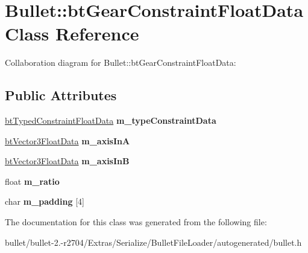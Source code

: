 \hypertarget{class_bullet_1_1bt_gear_constraint_float_data}{\section{Bullet\+:\+:bt\+Gear\+Constraint\+Float\+Data Class Reference}
\label{class_bullet_1_1bt_gear_constraint_float_data}
}


Collaboration diagram for Bullet\+:\+:bt\+Gear\+Constraint\+Float\+Data\+:
\subsection*{Public Attributes}
\begin{DoxyCompactItemize}
\item 
\hypertarget{class_bullet_1_1bt_gear_constraint_float_data_a323c708990de318fd67b847f8a03a0a0}{\hyperlink{class_bullet_1_1bt_typed_constraint_float_data}{bt\+Typed\+Constraint\+Float\+Data} {\bfseries m\+\_\+type\+Constraint\+Data}}\label{class_bullet_1_1bt_gear_constraint_float_data_a323c708990de318fd67b847f8a03a0a0}

\item 
\hypertarget{class_bullet_1_1bt_gear_constraint_float_data_a277e3f6c3859ef310a73b45ade3f6ab5}{\hyperlink{class_bullet_1_1bt_vector3_float_data}{bt\+Vector3\+Float\+Data} {\bfseries m\+\_\+axis\+In\+A}}\label{class_bullet_1_1bt_gear_constraint_float_data_a277e3f6c3859ef310a73b45ade3f6ab5}

\item 
\hypertarget{class_bullet_1_1bt_gear_constraint_float_data_a1ca6b34bf93eae7b27333a0022b8c9c3}{\hyperlink{class_bullet_1_1bt_vector3_float_data}{bt\+Vector3\+Float\+Data} {\bfseries m\+\_\+axis\+In\+B}}\label{class_bullet_1_1bt_gear_constraint_float_data_a1ca6b34bf93eae7b27333a0022b8c9c3}

\item 
\hypertarget{class_bullet_1_1bt_gear_constraint_float_data_a2bd0b052826df50cbe5cff16b21ece5b}{float {\bfseries m\+\_\+ratio}}\label{class_bullet_1_1bt_gear_constraint_float_data_a2bd0b052826df50cbe5cff16b21ece5b}

\item 
\hypertarget{class_bullet_1_1bt_gear_constraint_float_data_a63bc8b2402458fc05625d4f58b348b4e}{char {\bfseries m\+\_\+padding} \mbox{[}4\mbox{]}}\label{class_bullet_1_1bt_gear_constraint_float_data_a63bc8b2402458fc05625d4f58b348b4e}

\end{DoxyCompactItemize}


The documentation for this class was generated from the following file\+:\begin{DoxyCompactItemize}
\item 
bullet/bullet-\/2.-\/r2704/\+Extras/\+Serialize/\+Bullet\+File\+Loader/autogenerated/bullet.\+h\end{DoxyCompactItemize}
